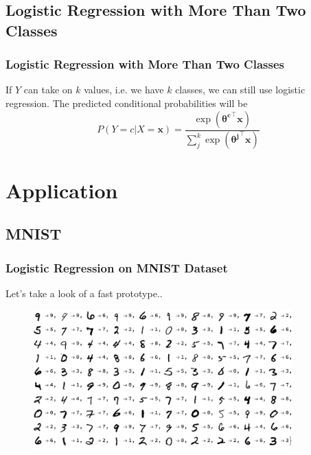 \documentclass{beamer}
\begin{document}
\subsection{Logistic Regression with More Than Two Classes}
\begin{frame}
\frametitle{Logistic Regression with More Than Two Classes}
If $Y$ can take on $k$ values, i.e. we have $k$ classes, we can still use logistic regression. The predicted conditional probabilities will be 
\begin{equation}
P(Y = c | X = \mathbf{x}) = \frac{\exp ({\bm{{\theta}^{c}} ^\intercal \mathbf{x}})}{ \sum_{j}^{k} \exp(\bm{{\theta}^{j} }^\intercal \mathbf{x}) }
\end{equation}
\end{frame}



\section{Application} 
\subsection{MNIST}
\begin{frame}
\frametitle{Logistic Regression on MNIST Dataset}
Let's take a look of a fast prototype..
\begin{figure}[t]
\includegraphics[width=10cm]{graphics/mnist}
\centering
\end{figure}
\end{frame}
\end{document}
